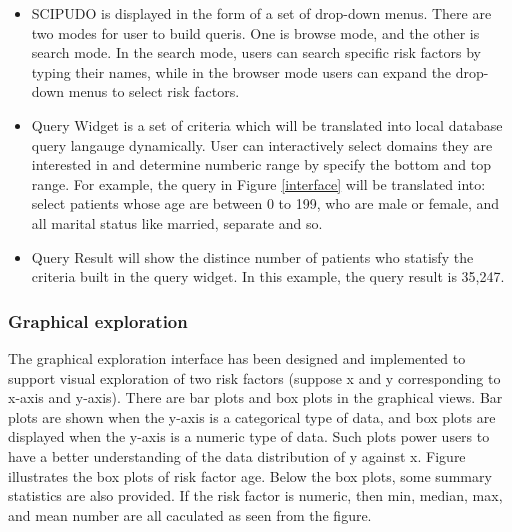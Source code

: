 \documentclass{amia}
\begin{document}
\vspace{-3mm}
\begin{itemize}
\setlength\itemsep{0em}
  \item SCIPUDO is displayed in the form of a set of drop-down menus. There are two modes for user to build queris. One is browse mode, and the other is search mode. In the search mode, users can search specific risk factors by typing their names, while in the browser mode users can expand the drop-down menus to select risk factors.
  \item Query Widget is a set of criteria which will be translated into local database query langauge dynamically. User can interactively select domains they are interested in and determine numberic range by specify the bottom and top range. For example, the query in Figure \ref{interface} will be translated into: select patients whose age are between 0 to 199, who are male or female, and all marital status like married, separate and so. 
  \item Query Result will show the distince number of patients who statisfy the criteria built in the query widget. In this example, the query result is 35,247.
\end{itemize}
\vspace{-3mm}

\subsubsection{Graphical exploration}
The graphical exploration interface has been designed and implemented to support visual exploration of two risk factors (suppose x and y corresponding to x-axis and y-axis). There are bar plots and box plots in the graphical views. Bar plots are shown when the y-axis is a categorical type of data, and box plots are displayed when the y-axis is a numeric type of data. Such plots power users to have a better understanding of the data distribution of y against x. Figure ~\cite{graphical} illustrates the box plots of risk factor age. Below the box plots, some summary statistics are also provided. If the risk factor is numeric, then min, median, max, and mean number are all caculated as seen from the figure.
\end{document}
